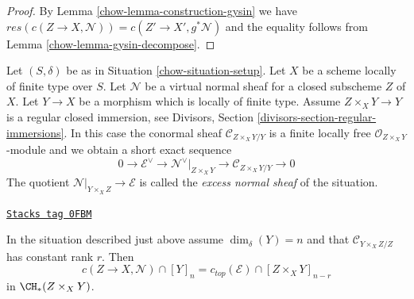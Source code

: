 \begin{proof}

By Lemma \ref{chow-lemma-construction-gysin} we have
$res(c(Z \to X, \mathcal{N})) = c(Z' \to X', g^*\mathcal{N})$
and the equality follows from Lemma \ref{chow-lemma-gysin-decompose}.
\end{proof}

Let $(S, \delta)$ be as in Situation \ref{chow-situation-setup}. Let $X$ be a scheme
locally of finite type over $S$. Let $\mathcal{N}$ be a virtual normal
sheaf for a closed subscheme $Z$ of $X$. Let $Y \to X$ be a morphism
which is locally of finite type. Assume $Z \times_X Y \to Y$ is a
regular closed immersion, see
Divisors, Section \ref{divisors-section-regular-immersions}.
In this case the conormal sheaf $\mathcal{C}_{Z \times_X Y/Y}$ is a finite
locally free $\mathcal{O}_{Z \times_X Y}$-module and we obtain a short
exact sequence
$$
0 \to \mathcal{E}^\vee \to
\mathcal{N}^\vee|_{Z \times_X Y} \to \mathcal{C}_{Z \times_X Y/Y} \to 0
$$
The quotient $\mathcal{N}|_{Y \times_X Z} \to \mathcal{E}$ is called the
{\it excess normal sheaf} of the situation.

\begin{lemma}
\label{chow-lemma-gysin-fundamental}
\href{https://stacks.math.columbia.edu/tag/0FBM}{\texttt{Stacks tag 0FBM}}

In the situation described just above assume $\dim_\delta(Y) = n$
and that $\mathcal{C}_{Y \times_X Z/Z}$ has constant rank $r$.
Then
$$
c(Z \to X, \mathcal{N}) \cap [Y]_n =
c_{top}(\mathcal{E}) \cap [Z \times_X Y]_{n - r}
$$
in $\CH_*(Z \times_X Y)$.
\end{lemma}

